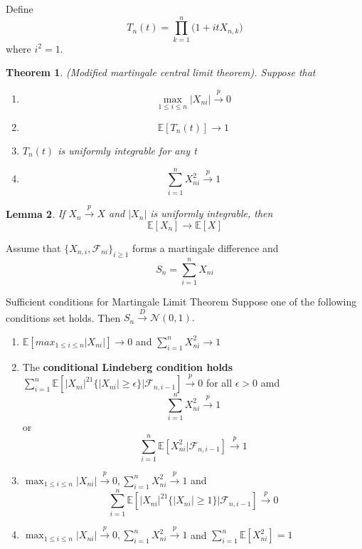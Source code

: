 \documentclass[twoside]{article}
\newcounter{lecnum}
\newtheorem{theorem}{Theorem}[lecnum]
\newtheorem{lemma}[theorem]{Lemma}
\begin{document}
Define 
$$
T_n(t) = \prod_{k=1}^{n}\big(1 + itX_{n,k} \big)
$$
where $i^2 = 1.$

\begin{theorem} (Modified martingale central limit theorem). Suppose that 
\begin{enumerate}
\item
\begin{equation}
\max_{1 \leq i \leq n}|X_{ni}| \xrightarrow{p} 0
\end{equation}
\item 
\begin{equation}
\mathbb{E}[T_n(t)] \rightarrow 1
\end{equation}
\item $T_n(t)$ is uniformly integrable for any t
\item 
\begin{equation}
\sum_{i=1}^{n}X_{ni}^{2} \xrightarrow{p} 1
\end{equation}
\end{enumerate}
\end{theorem}

\begin{lemma}
If $X_n \xrightarrow{p} X$ and $|X_n|$ is uniformly integrable, then 
$$
\mathbb{E}[X_n] \rightarrow \mathbb{E}[X]
$$
\end{lemma}



Assume that $\{X_{n,i}, \mathcal{F}_{ni}\}_{i \geq 1}$ forms a martingale difference and 
$$
S_n = \sum_{i=1}^{n}X_{ni}
$$


\begin{theorem_exam}{Sufficient conditions for Martingale Limit Theorem}{} Suppose one of the following conditions set holds. Then $S_n \xrightarrow{D} \mathcal{N}(0, 1).$

\begin{enumerate}
  \item $\mathbb{E}[max_{1 \leq i \leq n}|X_{ni}|] \rightarrow 0$ and $\sum_{i=1}^{n}X_{ni}^{2} \rightarrow 1$
  \item The \textbf{conditional Lindeberg condition holds} $\sum_{i=1}^{n}\mathbb{E}[|X_{ni}|^21\{|X_{ni}| \geq \epsilon\}| \mathcal{F}_{n, i-1}] \xrightarrow{p} 0$ for all $\epsilon > 0$ amd 
  $$
  \sum_{i=1}^{n}X_{ni}^{2} \xrightarrow{p} 1
  $$
  or 
  $$
  \sum_{i=1}^{n}\mathbb{E}[X_{ni}^{2}|\mathcal{F}_{n,i-1}] \xrightarrow{p} 1
  $$
  \item $\max_{1 \leq i \leq n}|X_{ni}| \xrightarrow{p} 0, \sum_{i=1}^{n}X_{ni}^{2} \xrightarrow{p} 1$ and 
  $$
  \sum_{i=1}^{n}\mathbb{E}[|X_{ni}|^21\{|X_{ni}| \geq 1\}|\mathcal{F}_{n,i-1}] \xrightarrow{p} 0
  $$
  \item $\max_{1 \leq i \leq n}|X_{ni}| \xrightarrow{p} 0, \sum_{i=1}^{n}X_{ni}^{2} \xrightarrow{p} 1$ and $\sum_{i=1}^{n}\mathbb{E}[X_{ni}^{2}] = 1$
\end{enumerate}
\end{theorem_exam}
\end{document}
